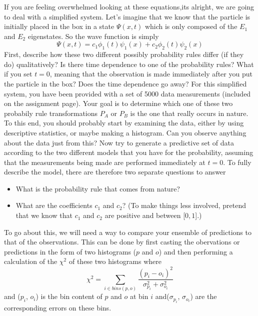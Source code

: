 If you are feeling overwhelmed looking at these equations,its alright, we are going to deal with a simplified system.  Let's imagine that we know that the particle is initially placed in the box in a state $\Psi(x,t)$ which is only composed of the $E_1$ and $E_2$ eigenstates.  So the wave function is simply 
\begin{displaymath}
\Psi(x,t)=c_{1}\phi_{1}(t)\psi_{1}(x)+c_{2}\phi_{2}(t)\psi_{2}(x)
\end{displaymath}
First, describe how these two different possibly probability rules differ (if they do) qualitatively?  Is there time dependence to one of the probability rules?  What if you set $t=$0, meaning that the observation is made immediately after you put the particle in the box?  Does the time dependence go away?
\newline
\newline
For this simplified system, you have been provided with a set of 5000 data measurements (included on the assignment page).  Your goal is to determine which one of these two probabily rule transformations $P_{A}$ or $P_{B}$ is the one that really occurs in nature.  To this end, you should probably start by examining the data, either by using descriptive statistics, or maybe making a histogram.  Can you observe anything about the data just from this?  Now try to generate a predictive set of data according to the two different models that you have for the probability, assuming that the measurements being made are performed immediately at $t=$0.  To fully describe the model, there are therefore two separate questions to answer
\begin{itemize}[noitemsep]
\item What is the probability rule that comes from nature?
\item What are the coefficients $c_1$ and $c_2$? (To make things less involved, pretend that we know that $c_1$ and $c_2$ are positive and between [$0,1$].)
\end{itemize}
To go about this, we will need a way to compare your ensemble of predictions to that of the observations.  This can be done by first casting the obervations or predictions in the form of two histograms ($p$ and $o$) and then performing a calculation of the $\chi^{2}$ of these two histograms where
\begin{displaymath}
\chi^{2}=\displaystyle\sum_{i \in bins(p,o)} \frac{(p_{i}-o_{i})^2}{\sigma_{p_{i}}^{2}+\sigma_{o_{i}}^{2}}
\end{displaymath}
and ($p_{i}$, $o_{i}$) is the bin content of $p$ and $o$ at bin $i$ and($\sigma_{p_{i}}$, $\sigma_{o_{i}}$) are the corresponding errors on these bins.
